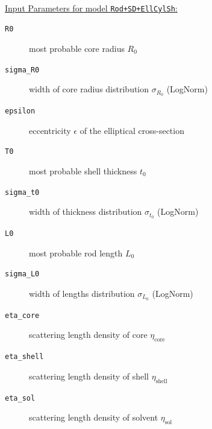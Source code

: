 \hspace{1pt}\\
\uline{Input Parameters for model \texttt{Rod+SD+EllCylSh}:}\\
\begin{description}
\item[\texttt{R0}] most probable core radius $R_0$
\item[\texttt{sigma\_R0}] width of core radius distribution $\sigma_{R_0}$  (LogNorm)
\item[\texttt{epsilon}] eccentricity $\epsilon$ of the elliptical cross-section
\item[\texttt{T0}] most probable shell thickness $t_0$
\item[\texttt{sigma\_t0}] width of thickness distribution $\sigma_{t_0}$ (LogNorm)
\item[\texttt{L0}] most probable rod length $L_0$
\item[\texttt{sigma\_L0}] width of lengths distribution $\sigma_{L_0}$ (LogNorm)
\item[\texttt{eta\_core}] scattering length density of core $\eta_\mathrm{core}$
\item[\texttt{eta\_shell}] scattering length density of shell $\eta_\mathrm{shell}$
\item[\texttt{eta\_sol}] scattering length density of solvent $\eta_\mathrm{sol}$
\end{description}
